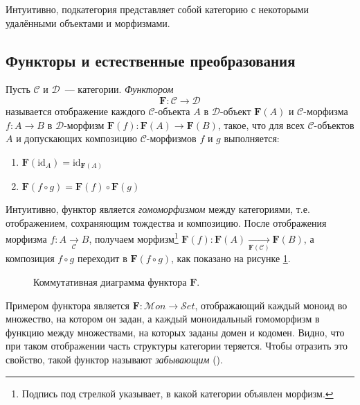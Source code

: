 Интуитивно, подкатегория представляет собой категорию с некоторыми удалёнными объектами и морфизмами.

\subsection{Функторы и естественные преобразования}
\begin{definition}
  Пусть $\mathcal{C}$ и $\mathcal{D}$~--- категории. \emph{Функтором} $$\mathbf{F} : \mathcal{C} \to \mathcal{D}$$ называется отображение каждого $\mathcal{C}$-объекта $A$ в $\mathcal{D}$-объект $\mathbf{F}(A)$ и $\mathcal{C}$-мор\-физ\-ма $f : A \to B$ в $\mathcal{D}$-морфизм $\mathbf{F}(f) : \mathbf{F}(A) \to \mathbf{F}(B)$, такое, что для всех $\mathcal{C}$-объектов $A$ и допускающих композицию $\mathcal{C}$-морфизмов $f$ и $g$ выполняется:
  \begin{enumerate}
    \item $\mathbf{F}(\mathrm{id}_A) = \mathrm{id}_{\mathbf{F}(A)}$
    \item $\mathbf{F}(f \circ g) = \mathbf{F}(f) \circ \mathbf{F}(g)$
  \end{enumerate}
\end{definition}

Интуитивно, функтор является \emph{гомоморфизмом} между категориями, т.е. отображением, сохраняющим тождества и композицию. После отображения морфизма $f : A \xrightarrow[\mathcal{C}]{} B$, получаем морфизм\footnote{Подпись под стрелкой указывает, в какой категории объявлен морфизм.} $\mathbf{F}(f) : \mathbf{F}(A) \xrightarrow[\mathbf{F}(\mathcal{C})]{} \mathbf{F}(B)$, а композиция $f \circ g$ переходит в $\mathbf{F}(f \circ g)$, как показано на рисунке \ref{cd:functor}.

\begin{figure}[h]
  \centering
    \caption{Коммутативная диаграмма функтора $\mathbf{F}$.}
    \label{cd:functor}
\end{figure}

Примером функтора является $\mathbf{F} : \mathcal{M}on \to \mathcal{S}et$, отображающий каждый моноид во множество, на котором он задан, а каждый моноидальный гомоморфизм в функцию между множествами, на которых заданы домен и кодомен. Видно, что при таком отображении часть структуры категории теряется. Чтобы отразить это свойство, такой функтор называют \emph{забывающим} (). 

